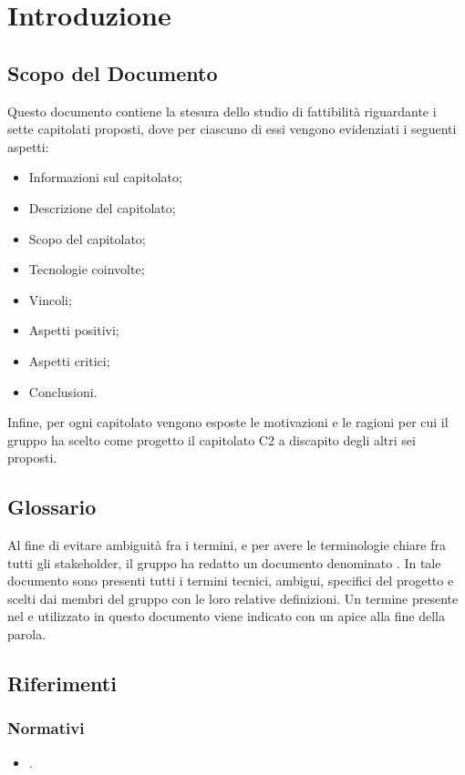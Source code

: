 \section{Introduzione}
\subsection{Scopo del Documento}
Questo documento contiene la stesura dello studio di fattibilità riguardante i sette capitolati proposti, dove per ciascuno di essi vengono evidenziati i seguenti aspetti:
\begin{itemize}
    \item Informazioni sul capitolato;
    \item Descrizione del capitolato;
    \item Scopo del capitolato;
    \item Tecnologie coinvolte;
    \item Vincoli;
    \item Aspetti positivi;
    \item Aspetti critici;
    \item Conclusioni.
\end{itemize}
Infine, per ogni capitolato vengono esposte le motivazioni e le ragioni per cui il gruppo ha scelto come progetto il capitolato C2 \NomeProgetto{} a discapito degli altri sei proposti.

\subsection{Glossario}
Al fine di evitare ambiguità fra i termini, e per avere le terminologie chiare fra tutti gli stakeholder, il gruppo \Gruppo{} ha redatto un documento denominato .
In tale documento sono presenti tutti i termini tecnici, ambigui, specifici del progetto e scelti dai membri del gruppo con le loro relative definizioni.
Un termine presente nel  e utilizzato in questo documento viene indicato con un apice  alla fine della parola.

\subsection{Riferimenti}

\subsubsection{Normativi}
\begin{itemize}
\item {}.
\end{itemize}

